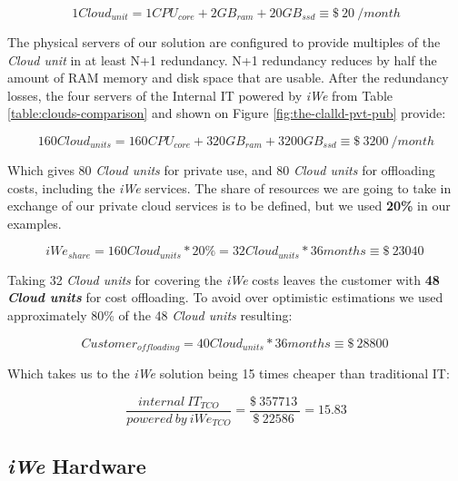 \begin{equation}
    1 Cloud_{unit} = 1 CPU_{core} + 2 GB_{ram} + 20 GB_{ssd} \equiv \SI{20}[\$]{}/month
\end{equation}

The physical servers of our solution are configured to provide multiples of the
\textit{Cloud unit} in at least N+1 redundancy. N+1 redundancy reduces by half
the amount of RAM memory and disk space that are usable. After the redundancy
losses, the four servers of the Internal IT powered by \textit{iWe} from
Table \ref{table:clouds-comparison} and shown on Figure
\ref{fig:the-clalld-pvt-pub} provide:

\begin{equation}
    160 Cloud_{units} = 160 CPU_{core} + 320 GB_{ram} + 3200 GB_{ssd} \equiv
    \SI{3200}[\$]{}/month
\end{equation}

Which gives 80 \textit{Cloud units} for private use, and 80 \textit{Cloud units}
for offloading costs, including the \textit{iWe} services. The share of
resources we are going to take in exchange of our private cloud services is to
be defined, but we used \textbf{20\%} in our examples.

\begin{equation}
    iWe_{share} = 160 Cloud_{units} * 20\% = 32 Cloud_{units} * 36 months
    \equiv \SI{23040}[\$]{}
\end{equation}

Taking 32 \textit{Cloud units} for covering the \textit{iWe} costs leaves the
customer with \textbf{48 \textit{Cloud units}} for cost offloading. To avoid
over optimistic estimations we used approximately 80\% of the 48 \textit{Cloud
units} resulting:


\begin{equation}
    Customer_{offloading} = 40 Cloud_{units} * 36 months \equiv \SI{28800}[\$]{}
\end{equation}

Which takes us to the \textit{iWe} solution being 15 times cheaper than
traditional IT:

\begin{equation}
    \frac{internal~IT_{TCO}}{powered~by~iWe_{TCO}} =
    \frac{\SI{357713}[\$]{}}{\SI{22586}[\$]{}} =
    15.83
\end{equation}

\subsection{\textit{iWe} Hardware} 
\label{subsec:ch}

